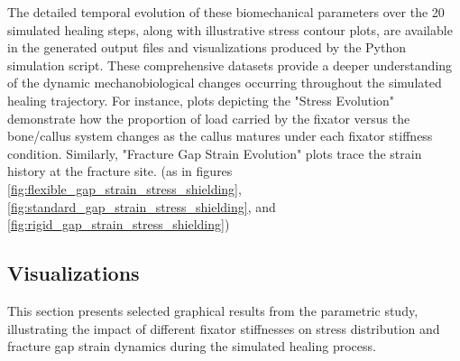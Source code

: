\documentclass{article}
\begin{document}
The detailed temporal evolution of these biomechanical parameters over the 20 simulated healing steps, along with illustrative stress contour plots, are available in the generated output files and visualizations produced by the Python simulation script. These comprehensive datasets provide a deeper understanding of the dynamic mechanobiological changes occurring throughout the simulated healing trajectory. For instance, plots depicting the "Stress Evolution" demonstrate how the proportion of load carried by the fixator versus the bone/callus system changes as the callus matures under each fixator stiffness condition. Similarly, "Fracture Gap Strain Evolution" plots trace the strain history at the fracture site. (as in figures \ref{fig:flexible_gap_strain_stress_shielding}, \ref{fig:standard_gap_strain_stress_shielding}, and \ref{fig:rigid_gap_strain_stress_shielding})

\subsection{Visualizations}
This section presents selected graphical results from the parametric study, illustrating the impact of different fixator stiffnesses on stress distribution and fracture gap strain dynamics during the simulated healing process.
\end{document}
